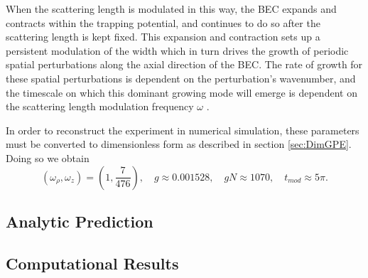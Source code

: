 \documentclass[12]{article}
\begin{document}
When the scattering length is modulated in this way, the BEC expands and contracts within the trapping potential, and continues to do so after the scattering length is kept fixed. This expansion and contraction sets up a persistent modulation of the width which in turn drives the growth of periodic spatial perturbations along the axial direction of the BEC. The rate of growth for these spatial perturbations is dependent on the perturbation's wavenumber, and the timescale on which this dominant growing mode will emerge is dependent on the scattering length modulation frequency $\omega$ \cite{mustafa}.

In order to reconstruct the experiment in numerical simulation, these parameters must be converted to dimensionless form as described in section \ref{sec:DimGPE}. Doing so we obtain
\begin{equation}
\left(\omega_\rho, \omega_z\right)=(1 , \textstyle\frac{7}{476}), \quad g \approx 0.001528, \quad gN \approx 1070, \quad t_{mod} \approx 5\pi.
\end{equation}

\subsection{Analytic Prediction}

\subsection{Computational Results}



\end{document}
